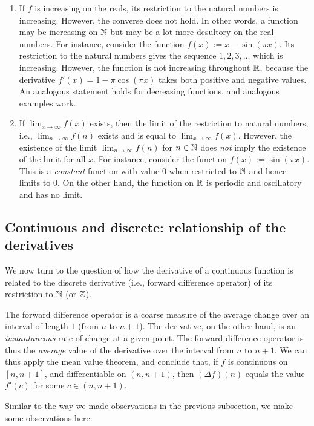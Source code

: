 \documentclass[10pt]{amsart}
\begin{document}
\begin{enumerate}
\item If $f$ is increasing on the reals, its restriction to the
  natural numbers is increasing. However, the converse does not
  hold. In other words, a function may be increasing on $\mathbb{N}$ but may
  be a lot more desultory on the real numbers. For instance, consider
  the function $f(x) := x - \sin(\pi x)$. Its restriction to the
  natural numbers gives the sequence $1,2,3,\dots$ which is
  increasing. However, the function is not increasing throughout $\mathbb{R}$,
  because the derivative $f'(x) = 1 - \pi \cos(\pi x)$ takes both
  positive and negative values. An analogous statement holds for
  decreasing functions, and analogous examples work.
\item If $\lim_{x \to \infty} f(x)$ exists, then the limit of the
  restriction to natural numbers, i.e., $\lim_{n \to \infty} f(n)$
  exists and is equal to $\lim_{x \to \infty} f(x)$. However, the
  existence of the limit $\lim_{n \to \infty} f(n)$ for $n \in \mathbb{N}$
  does {\em not} imply the existence of the limit for all $x$. For
  instance, consider the function $f(x) := \sin (\pi x)$. This is a
  {\em constant} function with value $0$ when restricted to $\mathbb{N}$ and
  hence limits to $0$. On the other hand, the function on $\mathbb{R}$ is
  periodic and oscillatory and has no limit.
\end{enumerate}

\subsection{Continuous and discrete: relationship of the derivatives}

We now turn to the question of how the derivative of a continuous
function is related to the discrete derivative (i.e., forward
difference operator) of its restriction to $\mathbb{N}$ (or $\mathbb{Z}$). 

The forward difference operator is a coarse measure of the average
change over an interval of length $1$ (from $n$ to $n + 1$). The
derivative, on the other hand, is an {\em instantaneous} rate of
change at a given point. The forward difference operator is thus the
{\em average} value of the derivative over the interval from $n$ to $n
+ 1$. We can thus apply the mean value theorem, and conclude that, if
$f$ is continuous on $[n,n+1]$, and differentiable on $(n,n+1)$, then
$(\Delta f)(n)$ equals the value $f'(c)$ for some $c \in (n,n+1)$.

Similar to the way we made observations in the previous subsection, we
make some observations here:
\end{document}
